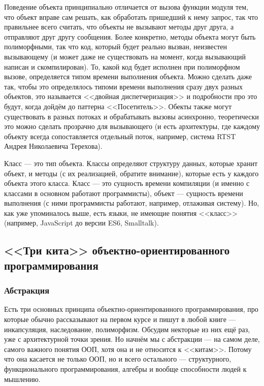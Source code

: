 \documentclass[a5paper]{article}
\begin{document}
Поведение объекта принципиально отличается от вызова функции модуля тем, что объект вправе сам решать, как обработать пришедший к нему запрос, так что правильнее всего считать, что объекты не вызывают методы друг друга, а отправляют друг другу сообщения. Более конкретно, методы объекта могут быть полиморфными, так что код, который будет реально вызван, неизвестен вызывающему (и может даже не существовать на момент, когда вызывающий написан и скомпилирован). То, какой код будет исполнен при полиморфном вызове, определяется типом времени выполнения объекта. Можно сделать даже так, чтобы это определялось типоми времени выполнения сразу двух разных объектов, это называется <<двойная диспетчеризация>> и подробности про это будут, когда дойдём до паттерна <<Посетитель>>. Обекты также могут существовать в разных потоках и обрабатывать вызовы асинхронно, теоретически это можно сделать прозрачно для вызывающего (и есть архитектуры, где каждому объекту всегда сопоставляется отдельный поток, например, система RTST Андрея Николаевича Терехова).

Класс --- это тип объекта. Классы определяют структуру данных, которые хранит объект, и методы (с их реализацией, обратите внимание), которые есть у каждого объекта этого класса. Класс --- это сущность времени компиляции (и именно с классами в основном работают программисты), объект --- сущность времени выполнения (с ними программисты работают, например, отлаживая систему). Но, как уже упоминалось выше, есть языки, не имеющие понятия <<класс>> (например, JavaScript до версии ES6, Smalltalk).

\subsection{<<Три кита>> объектно-ориентированного программирования}

\subsubsection{Абстракция}

Есть три основных принципа объектно-ориентированного программирования, про которые обычно рассказывают на первом курсе и пишут в любой книге --- инкапсуляция, наследование, полиморфизм. Обсудим некторые из них ещё раз, уже с архитектурной точки зрения. Но начнём мы с абстракции --- на самом деле, самого важного понятия ООП, хотя она и не относится к <<китам>>. Потому что она касается не только ООП, но и всего остального --- структурного, функционального программирования, алгебры и вообще способности людей к мышлению.
\end{document}
